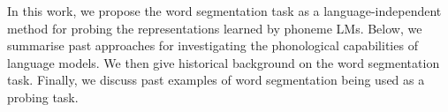 In this work, we propose the word segmentation task as a language-independent method for probing the representations learned by phoneme LMs. Below, we summarise past approaches for investigating the phonological capabilities of language models. We then give historical background on the word segmentation task. Finally, we discuss past examples of word segmentation being used as a probing task.











